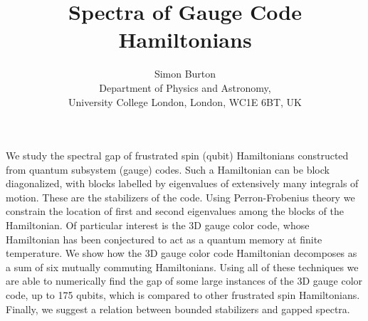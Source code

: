 \documentclass[11pt,oneside]{article}
\title{Spectra of Gauge Code Hamiltonians}
\author{Simon Burton\\
Department of Physics and Astronomy,\\
University College London, London, WC1E 6BT, UK
}
\begin{document}
\maketitle

We study the spectral gap of frustrated spin (qubit)
Hamiltonians constructed from quantum subsystem (gauge) codes.
Such a Hamiltonian can be block diagonalized, with
blocks labelled by eigenvalues of extensively many
integrals of motion. These are the stabilizers of the code.
Using Perron-Frobenius theory we constrain the
location of first and second eigenvalues among the
blocks of the Hamiltonian.
Of particular interest is the 3D gauge color code\cite{Bombin2015,Bombin2015single},
whose Hamiltonian has been conjectured to act as a quantum
memory at finite temperature. 
We show how the 3D gauge color code Hamiltonian decomposes as
a sum of six mutually commuting Hamiltonians.
Using all of these techniques 
we are able to numerically find the gap of some large instances
of the 3D gauge color code, up to 175 qubits, which is compared to 
other frustrated spin Hamiltonians.
Finally, we suggest a relation between bounded 
stabilizers and gapped spectra.

{}

\end{document}
